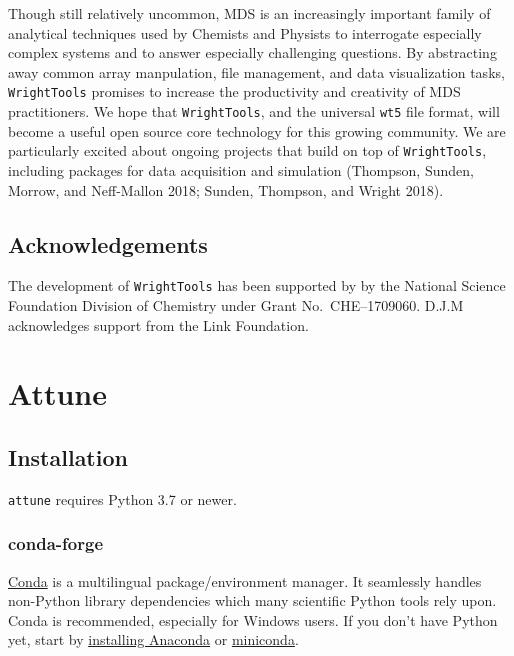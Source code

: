 Though still relatively uncommon, MDS is an increasingly important
family of analytical techniques used by Chemists and Physists to
interrogate especially complex systems and to answer especially
challenging questions. By abstracting away common array manpulation,
file management, and data visualization tasks, \texttt{WrightTools}
promises to increase the productivity and creativity of MDS
practitioners. We hope that \texttt{WrightTools}, and the universal
\texttt{wt5} file format, will become a useful open source core
technology for this growing community. We are particularly excited about
ongoing projects that build on top of \texttt{WrightTools}, including
packages for data acquisition and simulation (Thompson, Sunden, Morrow,
and Neff-Mallon 2018; Sunden, Thompson, and Wright 2018).

\hypertarget{acknowledgements}{%
\subsection{Acknowledgements}\label{acknowledgements}}

The development of \texttt{WrightTools} has been supported by by the
National Science Foundation Division of Chemistry under Grant
No.~CHE--1709060. D.J.M acknowledges support from the Link Foundation.

\section{Attune}  %


\subsection{Installation}\label{install}

\texttt{attune} requires Python 3.7 or newer.

\hypertarget{conda-forge}{%
\subsubsection{conda-forge}\label{conda-forge}}

\href{https://conda.io/docs/intro.html}{Conda} is a multilingual
package/environment manager. It seamlessly handles non-Python library
dependencies which many scientific Python tools rely upon. Conda is
recommended, especially for Windows users. If you don't have Python yet,
start by \href{https://www.continuum.io/downloads}{installing Anaconda}
or \href{https://conda.io/miniconda.html}{miniconda}.

